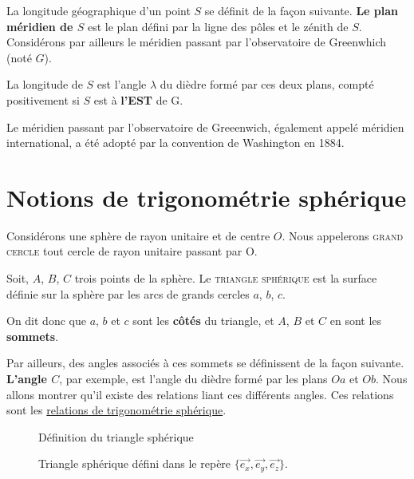\documentclass[12pt]{report}
\begin{document}
La longitude géographique d'un point $S$ se définit de la façon suivante. \textbf{Le plan méridien de $S$} est le plan défini par la ligne des pôles et le zénith de $S$. Considérons par ailleurs le méridien passant par l'observatoire de Greenwhich (noté $G$). 

La longitude de $S$ est l'angle $\lambda$ du dièdre formé par ces deux plans, compté positivement si $S$ est à \textbf{l'EST} de G.


Le méridien passant par l'observatoire de Greeenwich, également appelé méridien international, a été adopté par la convention de Washington en 1884.

\chapter{Notions de trigonométrie sphérique}

Considérons une sphère de rayon unitaire et de centre $O$. Nous appelerons \textsc{grand cercle} tout cercle de rayon unitaire passant par O.

Soit, $A$, $B$, $C$ trois points de la sphère. Le \textsc{triangle sphérique} est la surface définie sur la sphère par les arcs de grands cercles $a$, $b$, $c$.

On dit donc que $a$, $b$ et $c$ sont les \textbf{côtés} du triangle, et $A$, $B$ et $C$ en sont les \textbf{sommets}.

Par ailleurs, des angles associés à ces sommets se définissent de la façon suivante. \textbf{L'angle $C$}, par exemple, est l'angle du dièdre formé par les plans $Oa$ et $Ob$. Nous allons montrer qu'il existe des relations liant ces différents angles. Ces relations sont les \underline{relations de trigonométrie sphérique}.

\begin{figure}[ht]
\begin{center}
\end{center}
\caption{Définition du triangle sphérique}
\label{fig:6}
\end{figure}


\bigskip\bigskip

\begin{figure}[ht]
\begin{center}
\end{center}
\caption{Triangle sphérique défini dans le repère $\{\vec{e_x},\vec{e_y}, \vec{e_z}\}$.}  
\label{fig:7}
\end{figure}
\end{document}
